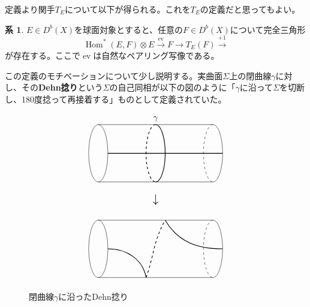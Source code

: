 \documentclass[uplatex,11pt,a4paper,dvipdfmx]{jsarticle}
\numberwithin{equation}{section}
\numberwithin{figure}{section}
\theoremstyle{definition}
\newtheorem{corollary}[theorem]{系}
\DeclareMathOperator{\Hom}{\mathrm{Hom}}
\DeclareMathOperator{\ev}{\mathrm{ev}}
\begin{document}
定義より関手$T_E$について以下が得られる。これを$T_E$の定義だと思ってもよい。
\begin{corollary}
    $E \in D^b(X)$を球面対象とすると、任意の$F \in D^b(X)$について完全三角形
    \begin{equation}\label{eq:twist}
        \Hom^*(E, F) \otimes E \xrightarrow{\ev} F \to T_E (F) \xrightarrow{+1}
    \end{equation}
    が存在する。ここで$\ev$は自然なペアリング写像である。
\end{corollary}
この定義のモチベーションについて少し説明する。実曲面$\Sigma$上の閉曲線$\gamma$に対し、その\textbf{Dehn捻り}という$\Sigma$の自己同相が以下の図のように「$\gamma$に沿って$\Sigma$を切断し、180度捻って再接着する」ものとして定義されていた。

\begin{figure}[h]
    \centering
    \begin{displaymath}
        \begin{tikzpicture}[scale=0.8]
            \draw (0,0+5)--(6,0+5);
            \draw (0,3+5)--(6,3+5);

            \draw[thick] (0.5, 1.5+5)--(6.5, 1.5+5);

            \draw (0, 1.5+5) circle[x radius=0.5, y radius=1.5];

            \draw(6, 0+5)arc(-90:90:0.5 and 1.5);
            \draw[dashed](6, 3+5)arc(90:270:0.5 and 1.5);

            \draw[thick](3, 0+5)arc(-90:90:0.5 and 1.5);
            \draw[thick, dashed](3, 3+5)arc(90:270:0.5 and 1.5);


            \draw(3, 3+5) node[above]{$\gamma$};

            \draw(3, -0.5+5) node[below]{\Large$\downarrow$};


            \draw (0,0)--(6,0);
            \draw (0,3)--(6,3);

            \draw (0, 1.5) circle[x radius=0.5, y radius=1.5];

            \draw(6, 0)arc(-90:90:0.5 and 1.5);
            \draw[dashed](6, 3)arc(90:270:0.5 and 1.5);

            \draw[thick](0.5, 1.5) to[out=0,in=100](2.5, 0);
            \draw[thick, dashed](2.5, 0) to[out=70,in=-120](3.5, 3);
            \draw[thick](3.5, 3) to[out=-60,in=180](6.5, 1.5);
        \end{tikzpicture}
    \end{displaymath}
    \caption{閉曲線$\gamma$に沿ったDehn捻り}
    \label{Dehn_twist}
\end{figure}
\end{document}
